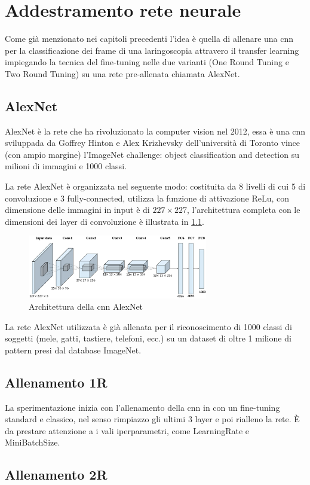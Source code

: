 \chapter{Addestramento rete neurale}\label{addestramento-rete-neurale}


Come già menzionato nei capitoli precedenti l’idea è quella di allenare una \gls{cnn} per la classificazione dei frame di una laringoscopia attravero il transfer learning impiegando la tecnica del
fine-tuning nelle due varianti (One Round Tuning e Two Round Tuning)  su una rete pre-allenata chiamata AlexNet.

\section{AlexNet}\label{alexnet}
AlexNet è la rete che ha rivoluzionato la computer vision nel 2012, essa è una \gls{cnn} sviluppada
da Goffrey Hinton e Alex Krizhevsky dell’università di Toronto vince (con ampio margine)
l’ImageNet challenge: object classification and detection su milioni di immagini e 1000 classi.

La rete AlexNet è organizzata nel seguente modo: costituita da 8 livelli di cui 5 di \gls{convoluzione} e 3 \gls{fully-connected}, utilizza la funzione
di attivazione \gls{ReLu}, con dimensione delle immagini in input è di \(227\times 227\), l'architettura completa con le dimensioni dei layer di \gls{convoluzione} è illustrata in \cref{fig:alexnet}\cite{alexnet}.  

\begin{figure}[ht]
    \centering
    \includegraphics[width=0.7\textwidth]{addestramento-rete-neurale/alexnet.png}
    \caption{Architettura della \gls{cnn} AlexNet}
    \label{fig:alexnet}
\end{figure}

La rete AlexNet utilizzata è già allenata per il riconoscimento di 1000 classi di soggetti (mele, gatti, tastiere, telefoni, ecc.) su un dataset di oltre 1 milione di pattern presi dal database ImageNet\cite{alexnet}.

\section{Allenamento 1R}\label{allenamento-1r}

La sperimentazione inizia con l'allenamento della \gls{cnn} in con un fine-tuning standard e classico, nel senso rimpiazzo gli ultimi 3 layer e poi rialleno la rete. È da prestare attenzione a i vali iperparametri, come \Gls{LearningRate} e \Gls{MiniBatchSize}.

\section{Allenamento 2R}\label{allenamento-2r}
